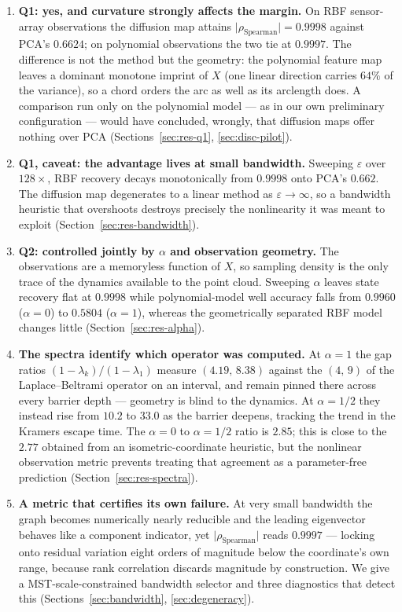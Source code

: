\documentclass[11pt]{article}
\newcommand{\eps}{\varepsilon}
\begin{document}
\begin{enumerate}
\item \textbf{Q1: yes, and curvature strongly affects the margin.} On RBF
sensor-array observations the diffusion map
attains $\lvert\rho_{\mathrm{Spearman}}\rvert = 0.9998$ against PCA's $0.6624$;
on polynomial observations the two tie at $0.9997$. The difference is not the
method but the geometry: the polynomial feature map leaves a dominant monotone
imprint of $X$ (one linear direction carries $64\%$ of the variance), so a chord
orders the arc as well as its arclength does. A comparison run only on the
polynomial model --- as in our own preliminary configuration --- would have
concluded, wrongly, that diffusion maps offer nothing over PCA
(Sections~\ref{sec:res-q1}, \ref{sec:disc-pilot}).

\item \textbf{Q1, caveat: the advantage lives at small bandwidth.} Sweeping
$\eps$ over $128\times$, RBF recovery decays monotonically from $0.9998$ onto
PCA's $0.662$. The diffusion map degenerates to a linear method as
$\eps \to \infty$, so a bandwidth heuristic that overshoots destroys precisely
the nonlinearity it was meant to exploit (Section~\ref{sec:res-bandwidth}).

\item \textbf{Q2: controlled jointly by $\alpha$ and observation geometry.} The
observations are a memoryless function of $X$, so sampling density is the only
trace of the dynamics available to the point cloud. Sweeping $\alpha$ leaves
state recovery flat at $0.9998$ while polynomial-model well accuracy falls from
$0.9960$ ($\alpha=0$) to $0.5804$ ($\alpha=1$), whereas the geometrically
separated RBF model changes little (Section~\ref{sec:res-alpha}).

\item \textbf{The spectra identify which operator was computed.} At $\alpha=1$
the gap ratios $(1-\lambda_k)/(1-\lambda_1)$ measure $(4.19,\,8.38)$ against the
$(4,\,9)$ of the Laplace--Beltrami operator on an interval, and remain pinned
there across every barrier depth --- geometry is blind to the dynamics. At
$\alpha=1/2$ they instead rise from $10.2$ to $33.0$ as the barrier deepens,
tracking the trend in the Kramers escape time. The $\alpha=0$ to $\alpha=1/2$
ratio is $2.85$; this is close to the $2.77$ obtained from an isometric-coordinate
heuristic, but the nonlinear observation metric prevents treating that agreement
as a parameter-free prediction (Section~\ref{sec:res-spectra}).

\item \textbf{A metric that certifies its own failure.} At very small bandwidth
the graph becomes numerically nearly reducible and the leading eigenvector behaves
like a component indicator, yet $\lvert\rho_{\mathrm{Spearman}}\rvert$ reads $0.9997$ ---
locking onto residual variation eight orders of magnitude below the coordinate's
own range, because rank correlation discards magnitude by construction. We give a
MST-scale-constrained bandwidth selector and three diagnostics that detect
this (Sections~\ref{sec:bandwidth}, \ref{sec:degeneracy}).
\end{enumerate}
\end{document}
